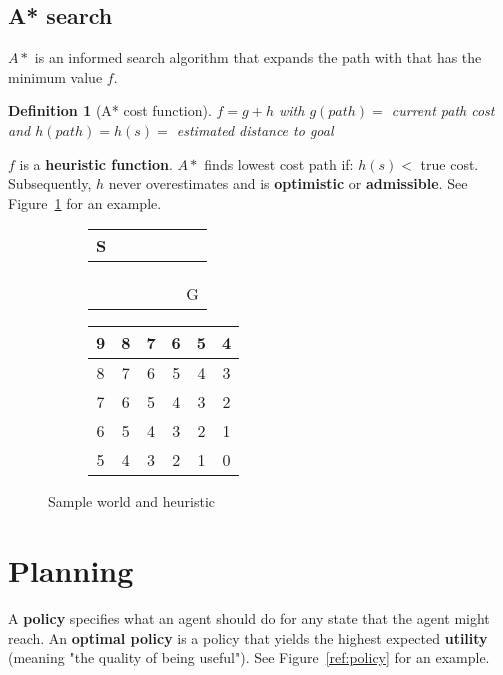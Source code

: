 \documentclass{report}
\newtheorem{definition}{Definition}[section]
\begin{document}
\section{A* search}
$A*$ is an informed search algorithm that expands the path with that has the minimum value $f$.

\begin{definition}[A* cost function]
$f = g + h$ with $g(path) =$ current path cost and $h(path) = h(s) =$ estimated distance to goal
\end{definition}

$f$ is a {\bf heuristic function}. $A*$ finds lowest cost path if: $h(s) <$ true cost. Subsequently, $h$ never overestimates and is {\bf optimistic} or {\bf admissible}. See Figure~\ref{ref:heuristic} for an example.

\begin{figure}[h!]
\centering
\begin{subfigure}[b]{0.3\textwidth}
\begin{tabular}{|c|c|c|c|c|c|}
\hline
S &\cellcolor{black}&&&& \\
\hline
&\cellcolor{black}&&&& \\
\hline
&\cellcolor{black}&&&& \\
\hline
&\cellcolor{black}&&&& \\
\hline
&&&&&G \\
\hline
\end{tabular}
\end{subfigure}
\begin{subfigure}[b]{0.3\textwidth}
\begin{tabular}{|c|c|c|c|c|c|}
\hline
9&8&7&6&5&4 \\
\hline
8&7&6&5&4&3 \\
\hline
7&6&5&4&3&2 \\
\hline
6&5&4&3&2&1 \\
\hline
5&4&3&2&1&0 \\
\hline
\end{tabular}
\end{subfigure}
\caption{Sample world and heuristic}
\label{ref:heuristic}
\end{figure}



\chapter{Planning}
\label{ref:chapterplanning}
A {\bf policy} specifies what an agent should do for any state that the agent might reach. An {\bf optimal policy} is a policy that yields the highest expected {\bf utility} (meaning "the quality of being useful"). See Figure~\ref{ref:policy} for an example.
\end{document}
